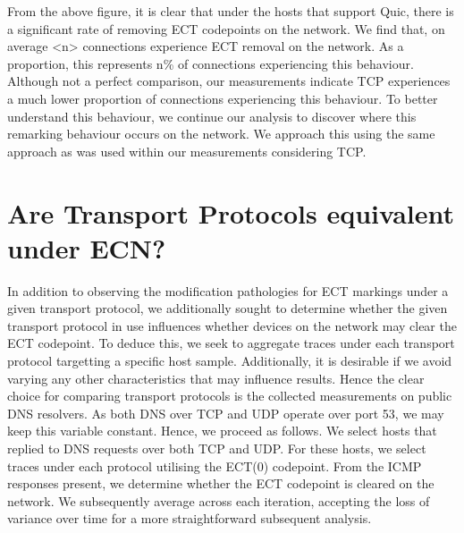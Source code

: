 \documentclass{l4proj}
\begin{document}
From the above figure, it is clear that under the hosts that support Quic, there is a significant rate of removing ECT codepoints on the network. We find that, on average <n> connections experience ECT removal on the network. As a proportion, this represents n\% of connections experiencing this behaviour. Although not a perfect comparison, our measurements indicate TCP experiences a much lower proportion of connections experiencing this behaviour. To better understand this behaviour, we continue our analysis to discover where this remarking behaviour occurs on the network. We approach this using the same approach as was used within our measurements considering TCP.

\section{Are Transport Protocols equivalent under ECN?}

In addition to observing the modification pathologies for ECT markings under a given transport protocol, we additionally sought to determine whether the given transport protocol in use influences whether devices on the network may clear the ECT codepoint. To deduce this, we seek to aggregate traces under each transport protocol targetting a specific host sample. Additionally, it is desirable if we avoid varying any other characteristics that may influence results. Hence the clear choice for comparing transport protocols is the collected measurements on public DNS resolvers. As both DNS over TCP and UDP operate over port 53, we may keep this variable constant. Hence, we proceed as follows. We select hosts that replied to DNS requests over both TCP and UDP. For these hosts, we select traces under each protocol utilising the ECT(0) codepoint. From the ICMP responses present, we determine whether the ECT codepoint is cleared on the network. We subsequently average across each iteration, accepting the loss of variance over time for a more straightforward subsequent analysis.
\end{document}
